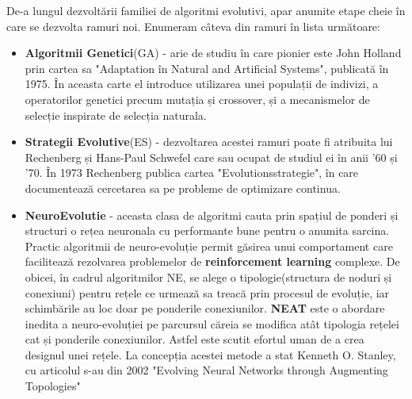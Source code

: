 De-a lungul dezvoltării familiei de algoritmi evolutivi, apar anumite etape cheie în care se dezvolta ramuri noi. Enumeram câteva din ramuri în lista următoare:
\begin{itemize}
    \item \textbf{Algoritmii Genetici}(GA) - arie de studiu în care pionier este John Holland prin cartea sa "Adaptation în Natural and Artificial Systems", publicată în 1975\cite{GA}. În aceasta carte el introduce utilizarea unei populații de indivizi, a operatorilor genetici precum mutația și crossover, și a mecanismelor de selecție inspirate de selecția naturala.
    \item \textbf{Strategii Evolutive}(ES) - dezvoltarea acestei ramuri poate fi atribuita lui Rechenberg și Hans-Paul Schwefel care sau ocupat de studiul ei în anii '60 și '70.
    În 1973 Rechenberg publica cartea "Evolutionsstrategie"\cite{ES}, în care documentează cercetarea sa pe probleme de optimizare continua.
    \item \textbf{NeuroEvolutie} - aceasta clasa de algoritmi cauta prin spațiul de ponderi și structuri o rețea neuronala cu performante bune pentru o anumita sarcina. Practic algoritmii de neuro-evoluție permit găsirea unui comportament care facilitează rezolvarea problemelor de \textbf{reinforcement learning} complexe\cite{SymbioticEvolution}. De obicei, în cadrul algoritmilor NE, se alege o tipologie(structura de noduri și conexiuni) pentru rețele ce urmează sa treacă prin procesul de evoluție, iar schimbările au loc doar pe ponderile conexiunilor. \textbf{NEAT} este o abordare inedita a neuro-evoluției pe parcursul căreia se modifica atât tipologia rețelei cat și ponderile conexiunilor. Astfel este scutit efortul uman de a crea designul unei rețele. La concepția acestei metode a stat Kenneth O. Stanley, cu articolul s-au din 2002 "Evolving Neural Networks through Augmenting Topologies"\cite{NEAT}
\end{itemize}

